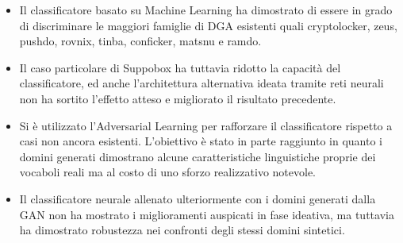 \begin{itemize}
\item Il classificatore basato su Machine Learning ha dimostrato di essere in grado di discriminare le maggiori famiglie di DGA esistenti quali cryptolocker, zeus, pushdo, rovnix, tinba, conficker, matsnu e ramdo. 

\item Il caso particolare di Suppobox ha tuttavia ridotto la capacità del classificatore, ed anche l'architettura alternativa ideata tramite reti neurali non ha sortito l'effetto atteso e migliorato il risultato precedente.

\item Si è utilizzato l'Adversarial Learning per rafforzare il classificatore rispetto a casi non ancora esistenti. L'obiettivo  è stato in parte raggiunto in quanto i domini generati dimostrano alcune caratteristiche linguistiche proprie dei vocaboli reali ma al costo di uno sforzo realizzativo notevole.

\item Il classificatore neurale allenato ulteriormente con i domini generati dalla GAN non ha mostrato i miglioramenti auspicati in fase ideativa, ma tuttavia ha dimostrato robustezza nei confronti degli stessi domini sintetici.
\end{itemize}